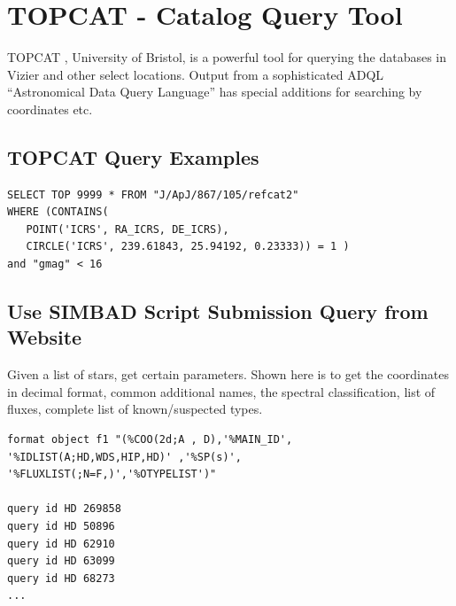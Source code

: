 \renewcommand{\footerfilename}{TOPCAT.tex}

\section{TOPCAT - Catalog Query Tool}

TOPCAT \cite{2005ASPC..347...29T}, University of Bristol, is a powerful
tool for querying the databases in Vizier and other select locations.
Output from a sophisticated ADQL   
``Astronomical Data Query Language'' \cite{2004ASPC..314..293Y}
has special additions for searching by coordinates etc.

\subsection{TOPCAT Query Examples}  \label{ref:TOPCATQueryExamples}


\begingroup \fontsize{10pt}{10pt}
\selectfont
\begin{verbatim} 
SELECT TOP 9999 * FROM "J/ApJ/867/105/refcat2" 
WHERE (CONTAINS(
   POINT('ICRS', RA_ICRS, DE_ICRS), 
   CIRCLE('ICRS', 239.61843, 25.94192, 0.23333)) = 1 )
and "gmag" < 16
\end{verbatim}
\endgroup


\subsection{Use SIMBAD Script Submission Query from Website}

Given a list of stars, get certain parameters. Shown here is to get the
coordinates in decimal format, common additional names, the spectral
classification, list of fluxes, complete list of known/suspected
types.

\begingroup \fontsize{10pt}{10pt}
\selectfont
\begin{verbatim} 
format object f1 "(%COO(2d;A , D),'%MAIN_ID', '%IDLIST(A;HD,WDS,HIP,HD)' ,'%SP(s)', '%FLUXLIST(;N=F,)','%OTYPELIST')"

query id HD 269858
query id HD 50896
query id HD 62910
query id HD 63099
query id HD 68273
...

\end{verbatim}
\endgroup


